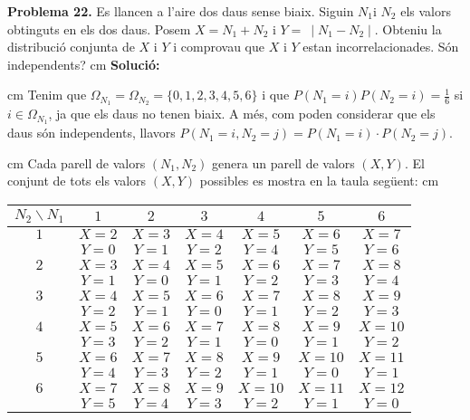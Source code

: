 \documentclass{article}
\begin{document}
\newpage
\noindent
\textbf{Problema 22.}
Es llancen a l'aire dos daus sense biaix. Siguin $N_1 \mbox{
i } N_2$ els valors obtinguts en els dos daus. Posem $X = N_1 +
N_2$ i $Y = \ \mid N_1 - N_2 \mid.$ Obteniu la distribuci\'o
conjunta de $X$ i $Y$ i comprovau que $X$ i $Y$ estan
incorrelacionades. S\'on independents?
 cm
\noindent
\textbf{Soluci\'o:} 

 cm
\noindent
Tenim que $\Omega_{N_1}=\Omega_{N_2}=\{ 0, 1, 2, 3, 4, 5, 6 \}$ i que $P(N_1=i)P(N_2=i)=\frac{1}{6}$
si $i \in \Omega_{N_1}$, ja que els daus no tenen biaix. A m\'es, com poden considerar que els
daus s\'on independents, llavors $P(N_1=i, N_2=j)=P(N_1=i) \cdot P(N_2=j)$.

 cm
\noindent
Cada parell de valors $(N_1, N_2)$ genera un parell de valors $(X, Y)$. El conjunt de tots els valors
$(X, Y)$ possibles es mostra en la taula seg\"uent:
 cm
\begin{center}
\begin{tabular}{c|c|c|c|c|c|c|}
$N_2 \backslash N_1$ & $1$ & $2$ & $3$ & $4$ & $5$ & $6$ \\ \hline
$1$ & $X=2$ & $X=3$ & $X=4$ & $X=5$ & $X=6$ & $X=7$  \\ 
    & $Y=0$ & $Y=1$ & $Y=2$ & $Y=4$ & $Y=5$ & $Y=6$  \\ \hline
$2$ & $X=3$ & $X=4$ & $X=5$ & $X=6$ & $X=7$ & $X=8$  \\ 
    & $Y=1$ & $Y=0$ & $Y=1$ & $Y=2$ & $Y=3$ & $Y=4$  \\ \hline
$3$ & $X=4$ & $X=5$ & $X=6$ & $X=7$ & $X=8$ & $X=9$  \\ 
    & $Y=2$ & $Y=1$ & $Y=0$ & $Y=1$ & $Y=2$ & $Y=3$  \\ \hline
$4$ & $X=5$ & $X=6$ & $X=7$ & $X=8$ & $X=9$ & $X=10$  \\ 
    & $Y=3$ & $Y=2$ & $Y=1$ & $Y=0$ & $Y=1$ & $Y=2$  \\ \hline
$5$ & $X=6$ & $X=7$ & $X=8$ & $X=9$ & $X=10$ & $X=11$  \\ 
    & $Y=4$ & $Y=3$ & $Y=2$ & $Y=1$ & $Y=0$ & $Y=1$  \\ \hline
$6$ & $X=7$ & $X=8$ & $X=9$ & $X=10$ & $X=11$ & $X=12$  \\ 
    & $Y=5$ & $Y=4$ & $Y=3$ & $Y=2$ & $Y=1$ & $Y=0$  \\ \hline
\end{tabular}
\end{center}
 
\end{document}

